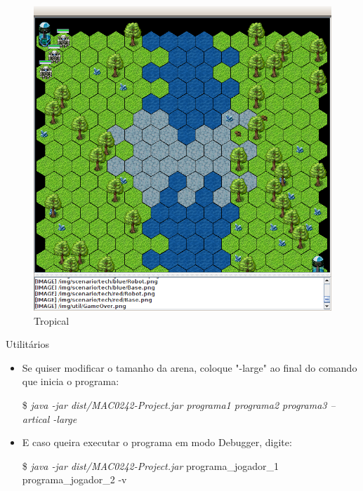 \documentclass[a4paper]{article}
\begin{document}
{{{{{{\begin{figure}[h]
   	\centering
    \includegraphics[scale=0.3]{img/tropical.png}
    \caption{Tropical}
\end{figure}

\newpage %

{\textcolor{NavyBlue}{\LARGE Utilitários}
\begin{itemize}

	\bigskip

	\item Se quiser modificar o tamanho da arena,
	coloque "-large" ao final do comando que inicia
	o programa:
	
	\$ \textit {java -jar dist/MAC0242-Project.jar programa1 programa2 programa3 --artical -large}

	\bigskip

	\item E caso queira executar o programa em modo 
	Debugger, digite:

	\$ \textit {java -jar dist/MAC0242-Project.jar }
    	  programa\_jogador\_1 programa\_jogador\_2 -v

	\bigskip
\end{itemize}



\newpage %



}}}}}}}
\end{document}
